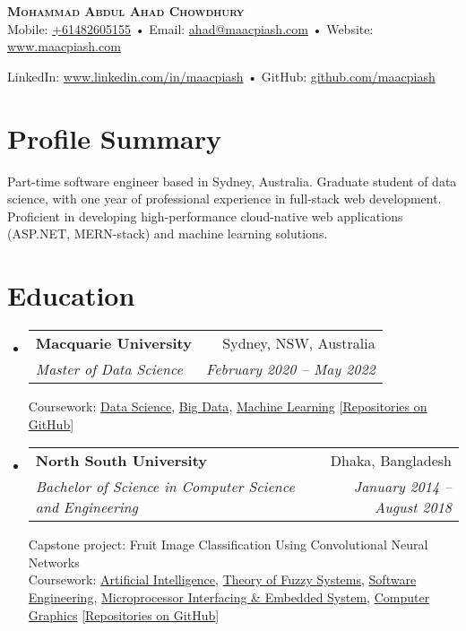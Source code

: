 \documentclass[a4-paper,10pt]{article}
\makeatletter
\newcommand{\resumeSubheading}[4]{
  \vspace{-1pt}\item
    \begin{tabular*}{0.97\textwidth}[t]{l@{\extracolsep{\fill}}r}
      \textbf{#1} & #2 \\
      \textit{#3} & \textit{ #4} \\
    \end{tabular*}\vspace{-5pt}
}
\newcommand{\resumeSubHeadingListStart}{\begin{itemize}[leftmargin=*]}
\newcommand{\resumeSubHeadingListEnd}{\end{itemize}}
\makeatother
\begin{document}
\begin{center}
    \textbf{\Huge \scshape Mohammad Abdul Ahad Chowdhury} \\ \vspace{2pt}
    \small
    {
        Mobile: \href{tel:+61482605155}{+61482605155} • Email: \href{mailto:ahad@maacpiash.com}{ahad@maacpiash.com} •
        Website: \href{https://www.maacpiash.com}{www.maacpiash.com}
    }
    
    \small
    {
        LinkedIn: \href{https://www.linkedin.com/in/maacpiash}{www.linkedin.com/in/maacpiash} •
        GitHub: \href{https://github.com/maacpiash}{github.com/maacpiash}
    }
\end{center}

\section{Profile Summary}
Part-time software engineer based in Sydney, Australia. Graduate student of data science, with one year of professional experience in full-stack web development. Proficient in developing high-performance cloud-native web applications (ASP.NET, MERN-stack) and machine learning solutions.


\section{Education}
  \resumeSubHeadingListStart
    \resumeSubheading
      {Macquarie University}{Sydney, NSW, Australia}
      {Master of Data Science}{February 2020 -- May 2022}

      Coursework: \href{https://github.com/maacpiash/COMP6200}{Data Science}, \href{https://github.com/maacpiash/COMP6210}{Big Data}, \href{https://github.com/maacpiash/COMP8220}{Machine Learning} [\href{https://github.com/maacpiash?tab=repositories&q=COMP}{\underline{Repositories on GitHub}}]
      
    \resumeSubheading
      {North South University}{Dhaka, Bangladesh}
      {Bachelor of Science in Computer Science and Engineering}{January 2014 -- August 2018}
      
      Capstone project: Fruit Image Classification Using Convolutional Neural Networks \\
      Coursework: \href{https://github.com/maacpiash/CSE440}{Artificial Intelligence}, \href{https://github.com/maacpiash/CSE470}{Theory of Fuzzy Systems}, \href{https://github.com/maacpiash/CSE327}{Software Engineering}, \href{https://github.com/maacpiash/CSE331}{Microprocessor Interfacing \& Embedded System}, \href{https://github.com/maacpiash/CSE418-SpaceShooter}{Computer Graphics}
      [\href{https://github.com/maacpiash?tab=repositories&q=CSE}{\underline{Repositories on GitHub}}]
  \resumeSubHeadingListEnd
\end{document}
